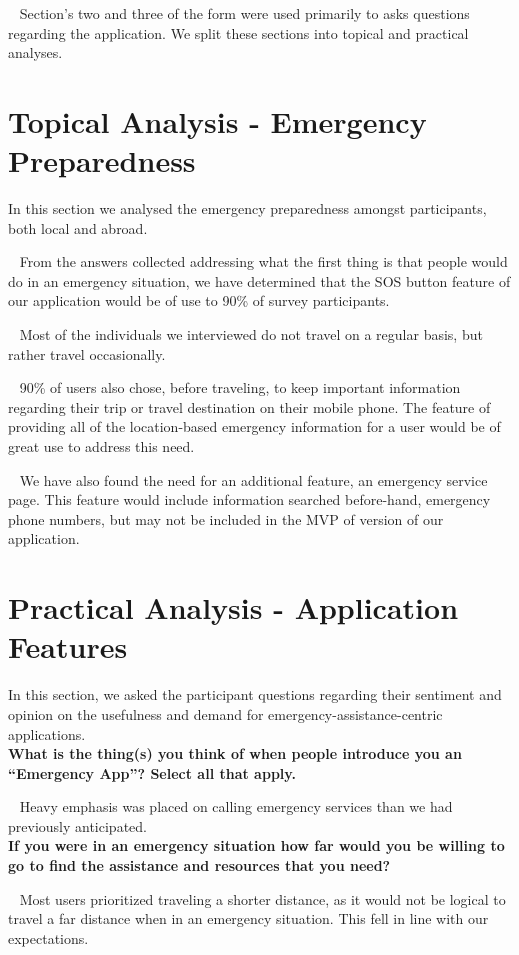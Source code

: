 \documentclass{scrreprt}
\begin{document}
\par ~ Section's two and three of the form were used primarily to asks questions regarding the application. We split these sections into topical and practical analyses.

\section{Topical Analysis - Emergency Preparedness}
In this section we analysed the emergency preparedness amongst participants, both local and abroad.

\par ~ From the answers collected addressing what the first thing is that people would do in an emergency situation, we have determined that the SOS button feature of our application would be of use to 90\% of survey participants.

\par ~ Most of the individuals we interviewed do not travel on a regular basis, but rather travel occasionally. 

\par ~ 90\% of users also chose, before traveling, to keep important information regarding their trip or travel destination on their mobile phone. The feature of providing all of the location-based emergency information for a user would be of great use to address this need.

\par ~ We have also found the need for an additional feature, an emergency service page. This feature would include information searched before-hand, emergency phone numbers, but may not be included in the MVP of version of our application.

\section{Practical Analysis - Application Features}
In this section, we asked the participant questions regarding their sentiment and opinion on the usefulness and demand for emergency-assistance-centric applications. \\

\textbf{What is the thing(s) you think of when people introduce you an ``Emergency App''? Select all that apply.} 
\par ~ Heavy emphasis was placed on calling emergency services than we had previously anticipated. \\

\textbf{If you were in an emergency situation how far would you be willing to go to find the assistance and resources that you need?} 
\par ~ Most users prioritized traveling a shorter distance, as it would not be logical to travel a far distance when in an emergency situation. This fell in line with our expectations. \\
\end{document}
